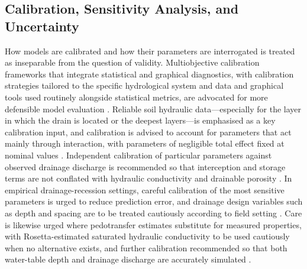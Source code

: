 \subsection{Calibration, Sensitivity Analysis, and Uncertainty}

How models are calibrated and how their parameters are interrogated is treated as inseparable from the question of validity. Multiobjective calibration frameworks that integrate statistical and graphical diagnostics, with calibration strategies tailored to the specific hydrological system and data and graphical tools used routinely alongside statistical metrics, are advocated for more defensible model evaluation \parencite{Bruhn2025}. Reliable soil hydraulic data---especially for the layer in which the drain is located or the deepest layers---is emphasised as a key calibration input, and calibration is advised to account for parameters that act mainly through interaction, with parameters of negligible total effect fixed at nominal values \parencite{Wang2006}. Independent calibration of particular parameters against observed drainage discharge is recommended so that interception and storage terms are not conflated with hydraulic conductivity and drainable porosity \parencite{Henine2022}. In empirical drainage-recession settings, careful calibration of the most sensitive parameters is urged to reduce prediction error, and drainage design variables such as depth and spacing are to be treated cautiously according to field setting \parencite{Timalsina2023}. Care is likewise urged where pedotransfer estimates substitute for measured properties, with Rosetta-estimated saturated hydraulic conductivity to be used cautiously when no alternative exists, and further calibration recommended so that both water-table depth and drainage discharge are accurately simulated \parencite{Malota2022}.

